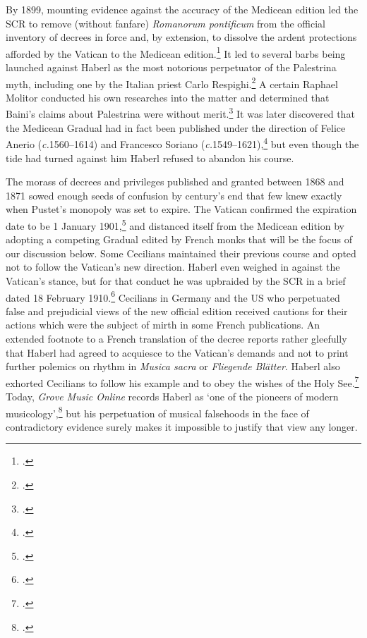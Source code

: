 By 1899, mounting evidence against the accuracy of the Medicean edition led the SCR to remove (without fanfare) \emph{Romanorum pontificum} from the official inventory of decrees in force and, by extension, to dissolve the ardent protections afforded by the Vatican to the Medicean edition.\footcites[175]{CombeRestorationGregorianChant2003}[166]{HayburnPapalLegislationSacred1979}
It led to several barbs being launched against Haberl as the most notorious perpetuator of the Palestrina myth, including one by the Italian priest Carlo Respighi.\footcite[6]{RespighiNuovoStudiosu1900}
A certain Raphael Molitor conducted his own researches into the matter and determined that Baini's claims about Palestrina were without merit.\footcites[pp.~v, 241]{MolitorNachTridentinischeChoralReformRom1901}[For an Anglophone discussion of Molitor's involvement see][205]{MuirRomanCatholicChurch2008}[See also the charge that Baini's lack of critical thinking belied his welter of claims in][34--5]{LockwoodGiovanniPierluigiPalestrina1975}
It was later discovered that the Medicean Gradual had in fact been published under the direction of Felice Anerio (\mbox{\textit{c.}1560--1614}) and Francesco Soriano (\mbox{\textit{c.}1549--1621}),\footcite[208--9]{HileyGregorianChant2009} but even though the tide had turned against him Haberl refused to abandon his course.

The morass of decrees and privileges published and granted between 1868 and 1871 sowed enough seeds of confusion by century's end that few knew exactly when Pustet's monopoly was set to expire.
The Vatican confirmed the expiration date to be 1 January 1901,\footcites[pp.~xix--xx, 69]{EllisPoliticsPlainchantfindesiecle2013}[For the SCR's decrees in question, see][150--4]{HayburnPapalLegislationSacred1979} and distanced itself from the Medicean edition by adopting a competing Gradual edited by French monks that will be the focus of our discussion below.
\label{sc:cecilian_resistance}%
Some Cecilians maintained their previous course and opted not to follow the Vatican's new direction.
Haberl even weighed in against the Vatican's stance, but for that conduct he was upbraided by the SCR in a brief dated 18 February 1910.\footcite[282--3]{HayburnPapalLegislationSacred1979}
Cecilians in Germany and the US who perpetuated false and prejudicial views of the new official edition received cautions for their actions which were the subject of mirth in some French publications.
An extended footnote to a French translation of the decree reports rather gleefully that Haberl had agreed to acquiesce to the Vatican's demands and not to print further polemics on rhythm in \emph{Musica sacra} or \emph{Fliegende Blätter}.
Haberl also exhorted Cecilians to follow his example and to obey the wishes of the Holy See.\footcites[82]{decisionromainerythme1910}[For the brief in Italian and in an alternative French translation, see][31--3]{editionsrythmiquesSolesmes1921}
Today, \emph{Grove Music Online} records Haberl as `one of the pioneers of modern musicology',\footcite{HaberlHaberlFranzXaver} but his perpetuation of musical falsehoods in the face of contradictory evidence surely makes it impossible to justify that view any longer.
\nowidow[2]
